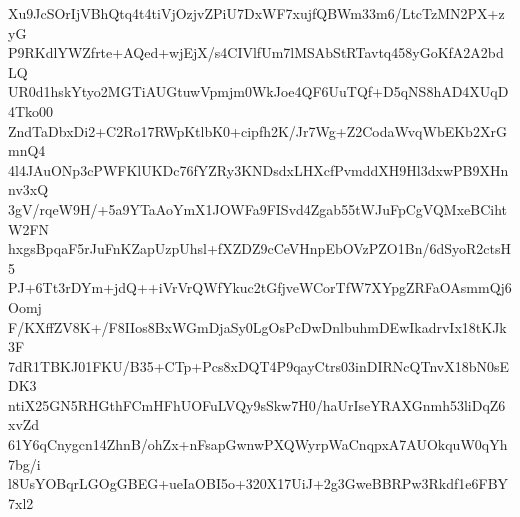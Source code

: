 Xu9JcSOrIjVBhQtq4t4tiVjOzjvZPiU7DxWF7xujfQBWm33m6/LtcTzMN2PX+zyG
P9RKdlYWZfrte+AQed+wjEjX/s4CIVlfUm7lMSAbStRTavtq458yGoKfA2A2bdLQ
UR0d1hskYtyo2MGTiAUGtuwVpmjm0WkJoe4QF6UuTQf+D5qNS8hAD4XUqD4Tko00
ZndTaDbxDi2+C2Ro17RWpKtlbK0+cipfh2K/Jr7Wg+Z2CodaWvqWbEKb2XrGmnQ4
4l4JAuONp3cPWFKlUKDc76fYZRy3KNDsdxLHXcfPvmddXH9Hl3dxwPB9XHnnv3xQ
3gV/rqeW9H/+5a9YTaAoYmX1JOWFa9FISvd4Zgab55tWJuFpCgVQMxeBCihtW2FN
hxgsBpqaF5rJuFnKZapUzpUhsl+fXZDZ9cCeVHnpEbOVzPZO1Bn/6dSyoR2ctsH5
PJ+6Tt3rDYm+jdQ++iVrVrQWfYkuc2tGfjveWCorTfW7XYpgZRFaOAsmmQj6Oomj
F/KXffZV8K+/F8IIos8BxWGmDjaSy0LgOsPcDwDnlbuhmDEwIkadrvIx18tKJk3F
7dR1TBKJ01FKU/B35+CTp+Pcs8xDQT4P9qayCtrs03inDIRNcQTnvX18bN0sEDK3
ntiX25GN5RHGthFCmHFhUOFuLVQy9sSkw7H0/haUrIseYRAXGnmh53liDqZ6xvZd
61Y6qCnygcn14ZhnB/ohZx+nFsapGwnwPXQWyrpWaCnqpxA7AUOkquW0qYh7bg/i
l8UsYOBqrLGOgGBEG+ueIaOBI5o+320X17UiJ+2g3GweBBRPw3Rkdf1e6FBY7xl2
